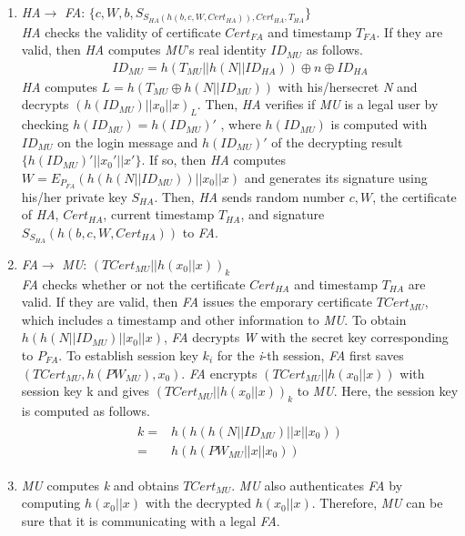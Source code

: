 \documentclass[letter]{ieice}%
\begin{document}
\begin{enumerate}
\item \emph{HA}$\rightarrow$ \emph{FA}: $\{c,W,b,S_{S_{HA} (h(b,c,W,{Cert}_{HA})),{Cert}_{HA},T_{HA}}\}$\\
   \emph{ HA} checks the validity of certificate $Cert_{FA}$ and timestamp $T_{FA}$. If they are valid, then \emph{HA }computes \emph{MU}’s real identity ${ID}_{MU}$ as follows.
   \begin{eqnarray}
    ID_{MU}=h(T_{MU} ||h(N||ID_{HA}))\oplus n \oplus ID_{HA}
   \end{eqnarray}
    \emph{HA} computes \emph{$L = h(T_{MU}\oplus h(N||{ID}_{MU}))$} with his/hersecret \emph{N} and decrypts $(h({ID}_{MU})||x_0||x)_L$. Then, \emph{HA } verifies if \emph{MU} is a legal user by checking \emph{$h({ID}_{MU}) =h({ID}_{MU})'$} , where $h({ID}_{MU})$ is computed with \emph{${ID}_{MU}$} on the login message and $h({ID}_{MU})'$ of the decrypting result $\{h({ID}_{MU})'||{x_0}'||x'\}$. If so, then \emph{HA} computes $W =E_{P_{FA}}(h(h(N||{ID}_{MU}))||x_0||x)$ and generates its signature using his/her private key $S_{HA}$. Then, \emph{HA} sends random number $c, W$, the certificate of \emph{HA}, ${Cert}_{HA}$, current timestamp $T_{HA}$, and signature $S_{S_{HA}} (h(b,c,W,{Cert}_{HA}))$ to \emph{FA}.

\item \emph{FA}$\rightarrow$ \emph{MU}: $(T{Cert}_{MU}||h(x_0||x))_k$\\
    \emph{FA} checks whether or not the certificate ${Cert}_{HA}$ and timestamp $T_{HA}$ are valid. If they are valid, then \emph{FA} issues the emporary certificate $T{Cert}_{MU}$, which includes a timestamp and other information to \emph{MU}. To obtain $h(h(N||ID_{MU})||x_0||x)$, \emph{FA} decrypts \emph{W} with the secret key corresponding to $P_{FA}$. To establish session key $k_i$ for the \emph{i}-th session, \emph{FA} first saves $(T{Cert}_{MU}, h({PW}_{MU}),x_0)$. \emph{FA} encrypts $(T{Cert}_{MU}||h(x_0||x))$ with session key k and gives $(T{Cert}_{MU}||h(x_0||x))_k$ to \emph{MU}. Here, the session key is computed as follows.
    \begin{eqnarray}%
    \begin{split}
     k=&h(h(h(N||ID_{MU})||x||x_0))%
    \\=&h(h(PW_{MU}||x||x_0))
    \end{split}
    \end{eqnarray}
\item \emph{MU} computes \emph{k} and obtains $T{Cert}_{MU}$. \emph{MU} also authenticates \emph{FA} by computing $h(x_0||x)$ with the decrypted $h(x_0||x)$. Therefore, \emph{MU} can be sure that it is communicating with a legal \emph{FA}.
\end{enumerate}
\end{document}
